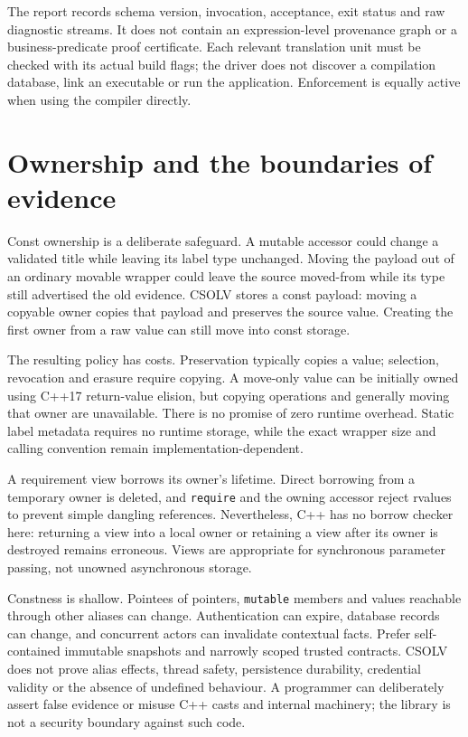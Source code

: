 \documentclass[11pt]{article}
\newcommand{\csolv}{\textsc{CSOLV}}
\begin{document}
The report records schema version, invocation, acceptance, exit status and raw
diagnostic streams. It does not contain an expression-level provenance graph
or a business-predicate proof certificate. Each relevant translation unit
must be checked with its actual build flags; the driver does not discover a
compilation database, link an executable or run the application. Enforcement
is equally active when using the compiler directly.

\section{Ownership and the boundaries of evidence}
Const ownership is a deliberate safeguard. A mutable accessor could change a
validated title while leaving its label type unchanged. Moving the payload
out of an ordinary movable wrapper could leave the source moved-from while
its type still advertised the old evidence. \csolv{} stores a const payload:
moving a copyable owner copies that payload and preserves the source value.
Creating the first owner from a raw value can still move into const storage.

The resulting policy has costs. Preservation typically copies a value;
selection, revocation and erasure require copying. A move-only value can be
initially owned using C++17 return-value elision, but copying operations and
generally moving that owner are unavailable. There is no promise of zero
runtime overhead. Static label metadata requires no runtime storage, while
the exact wrapper size and calling convention remain implementation-dependent.

A requirement view borrows its owner's lifetime. Direct borrowing from a
temporary owner is deleted, and \texttt{require} and the owning accessor reject
rvalues to prevent simple dangling references. Nevertheless, C++ has no borrow
checker here: returning a view into a local owner or retaining a view after its
owner is destroyed remains erroneous. Views are appropriate for synchronous
parameter passing, not unowned asynchronous storage.

Constness is shallow. Pointees of pointers, \texttt{mutable} members and values
reachable through other aliases can change. Authentication can expire,
database records can change, and concurrent actors can invalidate contextual
facts. Prefer self-contained immutable snapshots and narrowly scoped trusted
contracts. CSOLV does not prove alias effects, thread safety, persistence
durability, credential validity or the absence of undefined behaviour. A
programmer can deliberately assert false evidence or misuse C++ casts and
internal machinery; the library is not a security boundary against such code.
\end{document}
